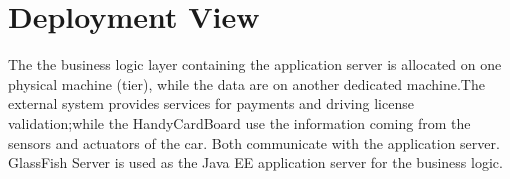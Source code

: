 \section{Deployment View}
The the business logic layer containing the application server is allocated on one physical machine (tier), while the data are on another dedicated machine.The external system provides services for payments and driving license validation;while the HandyCardBoard use the information coming from the sensors and actuators of the car. Both communicate with the application server.
GlassFish Server is used as the Java EE application server for the business logic.

	
